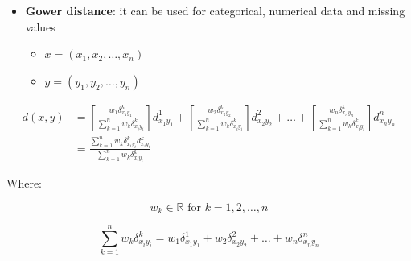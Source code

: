 \documentclass[
  ignorenonframetext,
]{beamer}
\providecommand{\tightlist}{%
  \setlength{\itemsep}{0pt}\setlength{\parskip}{0pt}}\usepackage{longtable,booktabs,array}
\begin{document}
\begin{frame}{}
\label{section-12}
\begin{itemize}
\item
  \textbf{Gower distance}: it can be used for categorical, numerical
  data and missing values

  \begin{itemize}
  \tightlist
  \item
    \(x = (x_1, x_2, \ldots, x_n)\)
  \item
    \(y = (y_1, y_2, \ldots, y_n)\)
  \end{itemize}
\end{itemize}

\tiny

\[\begin{split}
  d(x,y) & = \left[ \frac{w_1\delta_{x_1y_1}^k}{\sum_{k=1}^n w_k\delta_{x_iy_i}^k}\right] d_{x_1y_1}^1 + \left[ \frac{w_2\delta_{x_2y_2}^k}{\sum_{k=1}^n w_k\delta_{x_iy_i}^k} \right] d_{x_2y_2}^2 + \ldots + \left[ \frac{w_n\delta_{x_ny_n}^k}{\sum_{k=1}^n w_k\delta_{x_iy_i}^k} \right] d_{x_ny_n}^n \\ 
  & = \frac{\sum_{k=1}^n w_k \delta_{x_iy_i}^kd_{x_iy_i}^k}{\sum_{k=1}^n w_k\delta_{x_iy_i}^k}
  \end{split}\]

\scriptsize

Where:

\footnotesize

\[w_k \in \mathbb{R} \text{ for } k = 1, 2, \ldots, n\]

\[\sum_{k=1}^n w_k\delta_{x_iy_i}^k = w_1\delta_{x_1y_1}^1 + w_2\delta_{x_2y_2}^2 + \ldots + w_n\delta_{x_ny_n}^n\]
\end{frame}
\end{document}

